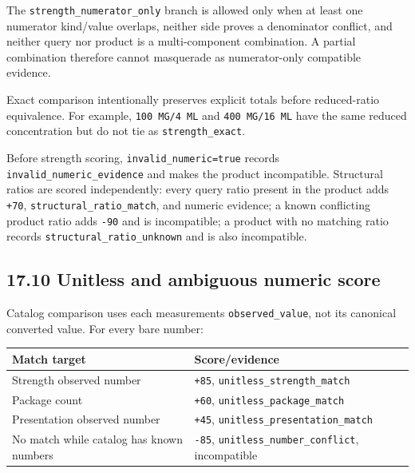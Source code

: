 The \texttt{strength\_\allowbreak{}numerator\_\allowbreak{}only} branch is allowed only when at least one numerator kind/value overlaps, neither side proves a denominator conflict, and neither query nor product is a multi-component combination. A partial combination therefore cannot masquerade as numerator-only compatible evidence.

Exact comparison intentionally preserves explicit totals before reduced-ratio equivalence. For example, \texttt{100\ MG/4\ ML} and \texttt{400\ MG/16\ ML} have the same reduced concentration but do not tie as \texttt{strength\_\allowbreak{}exact}.

Before strength scoring, \texttt{invalid\_\allowbreak{}numeric=true} records \texttt{invalid\_\allowbreak{}numeric\_\allowbreak{}evidence} and makes the product incompatible. Structural ratios are scored independently: every query ratio present in the product adds \texttt{+70}, \texttt{structural\_\allowbreak{}ratio\_\allowbreak{}match}, and numeric evidence; a known conflicting product ratio adds \texttt{-90} and is incompatible; a product with no matching ratio records \texttt{structural\_\allowbreak{}ratio\_\allowbreak{}unknown} and is also incompatible.

\subsection{17.10 Unitless and ambiguous numeric score}\label{1710-unitless-and-ambiguous-numeric-score}

Catalog comparison uses each measurement\textquotesingle s \texttt{observed\_\allowbreak{}value}, not its canonical converted value. For every bare number:

{\def\LTcaptype{none} %
\begin{longtable}[]{@{}>{\RaggedRight\arraybackslash}p{.27\linewidth}>{\RaggedRight\arraybackslash}p{.66\linewidth}@{}}
\toprule\noalign{}
Match target & Score/evidence \\
\midrule\noalign{}
\endhead
\bottomrule\noalign{}
\endlastfoot
Strength observed number & \texttt{+85}, \texttt{unitless\_\allowbreak{}strength\_\allowbreak{}match} \\
Package count & \texttt{+60}, \texttt{unitless\_\allowbreak{}package\_\allowbreak{}match} \\
Presentation observed number & \texttt{+45}, \texttt{unitless\_\allowbreak{}presentation\_\allowbreak{}match} \\
No match while catalog has known numbers & \texttt{-85}, \texttt{unitless\_\allowbreak{}number\_\allowbreak{}conflict}, incompatible \\
\end{longtable}
}

